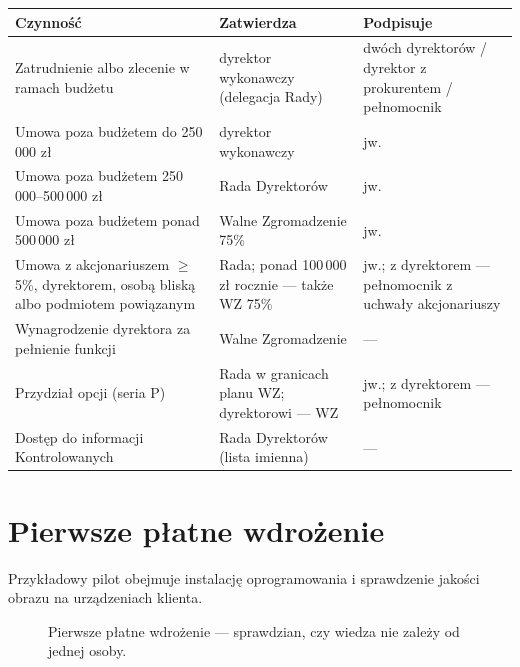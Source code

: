 \documentclass[11pt,a4paper]{report}
\begin{document}
\begin{center}
\small
\begin{tabularx}{\linewidth}{@{}>{\raggedright\arraybackslash}X >{\raggedright\arraybackslash}p{4.4cm} >{\raggedright\arraybackslash}p{4.0cm}@{}}
\toprule
\textbf{Czynność} & \textbf{Zatwierdza} & \textbf{Podpisuje} \\
\midrule
Zatrudnienie albo zlecenie w ramach budżetu & dyrektor wykonawczy (delegacja Rady) & dwóch dyrektorów / dyrektor z prokurentem / pełnomocnik \\
Umowa poza budżetem do 250\,000 zł & dyrektor wykonawczy & jw. \\
Umowa poza budżetem 250\,000--500\,000 zł & Rada Dyrektorów & jw. \\
Umowa poza budżetem ponad 500\,000 zł & Walne Zgromadzenie 75\% & jw. \\
Umowa z akcjonariuszem $\geq$5\%, dyrektorem, osobą bliską albo podmiotem powiązanym & Rada; ponad 100\,000 zł rocznie --- także WZ 75\% & jw.; z dyrektorem --- pełnomocnik z uchwały akcjonariuszy \\
Wynagrodzenie dyrektora za pełnienie funkcji & Walne Zgromadzenie & --- \\
Przydział opcji (seria P) & Rada w granicach planu WZ; dyrektorowi --- WZ & jw.; z dyrektorem --- pełnomocnik \\
Dostęp do informacji Kontrolowanych & Rada Dyrektorów (lista imienna) & --- \\
\bottomrule
\end{tabularx}
\end{center}

\section{Pierwsze płatne wdrożenie}

Przykładowy pilot obejmuje instalację oprogramowania i sprawdzenie jakości obrazu na urządzeniach klienta.

\begin{figure}[H]
\centering
{}
\caption{Pierwsze płatne wdrożenie --- sprawdzian, czy wiedza nie zależy od jednej osoby.}
\end{figure}
\end{document}
